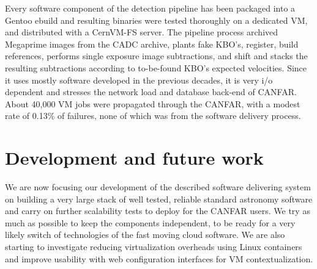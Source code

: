 \documentclass[11pt,twoside]{article}
\begin{document}
Every software component of the detection pipeline has
been packaged into a Gentoo ebuild and resulting binaries were tested
thoroughly on a dedicated VM, and distributed with a CernVM-FS
server. The pipeline process archived Megaprime images from the CADC archive,
plants fake KBO's, register, build references, performs single
exposure image subtractions, and shift and stacks the resulting
subtractions according to to-be-found KBO's expected velocities. Since
it uses mostly software developed in the previous decades, it is very
i/o dependent and stresses the network load and database back-end of
CANFAR. About 40,000 VM jobs were propagated through the CANFAR, with
a modest rate of 0.13\% of failures, none of which was from the software
delivery process.

\section{Development and future work}
We are now focusing our development of the described software
delivering system on building a very large stack of well tested,
reliable standard astronomy software and carry on further scalability
tests to deploy for the CANFAR users. We try as much as possible to keep the components
independent, to be ready for a very likely switch of technologies of
the fast moving cloud software. We are also starting to investigate
reducing virtualization overheads using Linux containers and improve
usability with web configuration interfaces for VM contextualization.


\end{document}
